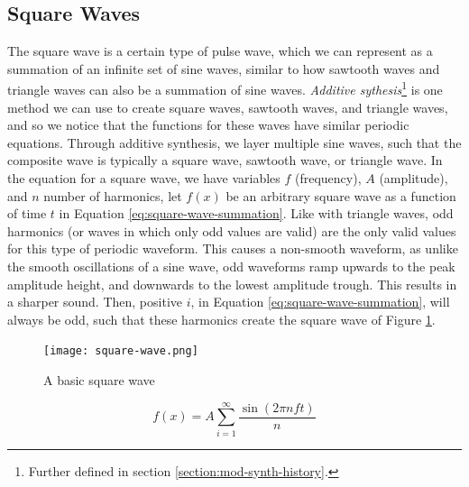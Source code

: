\subsection{Square Waves}

The square wave is a certain type of pulse wave, which we can represent as a summation of an infinite set of sine waves, similar to how sawtooth waves and triangle waves can also be a summation of sine waves. \textit{Additive sythesis}\footnote{Further defined in section \ref{section:mod-synth-history}.} is one method we can use to create square waves, sawtooth waves, and triangle waves, and so we notice that the functions for these waves have similar periodic equations. Through additive synthesis, we layer multiple sine waves, such that the composite wave is typically a square wave, sawtooth wave, or triangle wave. In the equation for a square wave, we have variables $f$ (frequency), $A$ (amplitude), and $n$ number of harmonics, let $f(x)$ be an arbitrary square wave as a function of time $t$ in Equation \ref{eq:square-wave-summation}. Like with triangle waves, odd harmonics (or waves in which only odd values are valid) are the only valid values for this type of periodic waveform. This causes a non-smooth waveform, as unlike the smooth oscillations of a sine wave, odd waveforms ramp upwards to the peak amplitude height, and downwards to the lowest amplitude trough. This results in a sharper sound. Then, positive $i$, in Equation \ref{eq:square-wave-summation}, will always be odd, such that these harmonics create the square wave of Figure \ref{fig:square-wave}.

\begin{figure}[ht]
  \centering
  \texttt{[image: square-wave.png]}
  \caption{A basic square wave}
  \label{fig:square-wave}
\end{figure}

\begin{equation}
	f(x) = A\sum_{i=1}^{\infty}\frac{\sin(2\pi nft)}{n}
	\label{eq:square-wave-summation}
\end{equation}

